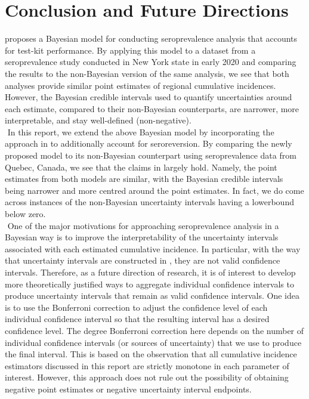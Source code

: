 \section{Conclusion and Future Directions}
\cite{meyer2022adjusting} proposes a Bayesian model for conducting seroprevalence analysis that accounts for test-kit performance. By applying this model to a dataset from a seroprevalence study conducted in New York state in early 2020 and comparing the results to the non-Bayesian version of the same analysis, we see that both analyses provide similar point estimates of regional cumulative incidences. However, the Bayesian credible intervals used to quantify uncertainties around each estimate, compared to their non-Bayesian counterparts, are narrower, more interpretable, and stay well-defined (non-negative).\\
\newline$ $
In this report, we extend the above Bayesian model by incorporating the approach in \cite{lewin2022seroprevalence} to additionally account for seroreversion. By comparing the newly proposed model to its non-Bayesian counterpart using seroprevalence data from Quebec, Canada, we see that the claims in \cite{meyer2022adjusting} largely hold. Namely, the point estimates from both models are similar, with the Bayesian credible intervals being narrower and more centred around the point estimates. In fact, we do come across instances of the non-Bayesian uncertainty intervals having a lowerbound below zero.\\
\newline$ $
One of the major motivations for approaching seroprevalence analysis in a Bayesian way is to improve the interpretability of the uncertainty intervals associated with each estimated cumulative incidence. In particular, with the way that uncertainty intervals are constructed in \cite{meyer2022adjusting}, they are not valid confidence intervals. Therefore, as a future direction of research, it is of interest to develop more theoretically justified ways to aggregate individual confidence intervals to produce uncertainty intervals that remain as valid confidence intervals. One idea is to use the Bonferroni correction to adjust the confidence level of each individual confidence interval so that the resulting interval has a desired confidence level. The degree Bonferroni correction here depends on the number of individual confidence intervals (or sources of uncertainty) that we use to produce the final interval. This is based on the observation that all cumulative incidence estimators discussed in this report are strictly monotone in each parameter of interest. However, this approach does not rule out the possibility of obtaining negative point estimates or negative uncertainty interval endpoints.\\

